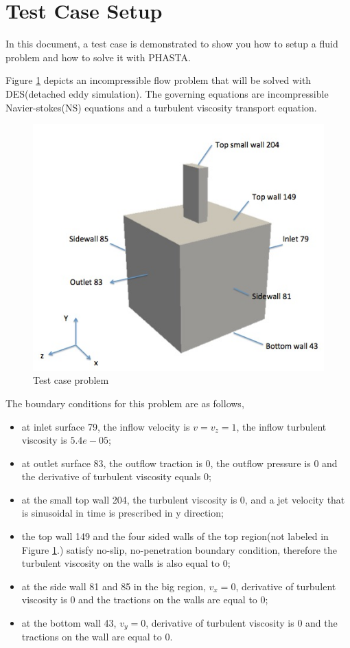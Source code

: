 \documentclass{article}
\begin{document}
\section{Test Case Setup}

 In this document, a test case is demonstrated to show you how to setup a fluid problem and how to solve it with PHASTA. 

Figure \ref{fig:1} depicts an incompressible flow problem that will be solved with DES(detached eddy simulation). The governing equations are incompressible Navier-stokes(NS) equations and a turbulent viscosity transport equation. 

\begin{figure}[h!]
\centering
\includegraphics[width=1\textwidth]{fig1}
\caption{Test case problem}
\label{fig:1}
\end{figure}
The boundary conditions for this problem are as follows,
\begin{itemize} 
\item at inlet surface 79, the inflow velocity is $v = v_z= 1$, the inflow turbulent viscosity is $5.4e-05$;
\item at outlet surface 83, the outflow traction is $0$, the outflow pressure is $0$ and the derivative of turbulent viscosity equals $0$; 
\item at the small top wall 204, the turbulent viscosity is $0$, and a jet velocity that is sinusoidal in time is prescribed in y direction; 
\item the top wall 149 and the four sided walls of the top region(not labeled in Figure \ref{fig:1}.) satisfy no-slip, no-penetration boundary condition, therefore the turbulent viscosity on the walls is also equal to $0$;
\item at the side wall 81 and 85 in the big region, $v_x=0$, derivative of turbulent viscosity is $0$ and the tractions on the walls are equal to $0$;\\
\item at the bottom wall 43, $v_y=0$, derivative of turbulent viscosity is $0$ and the tractions on the wall are equal to $0$.\\
\end{itemize} 
\end{document}
